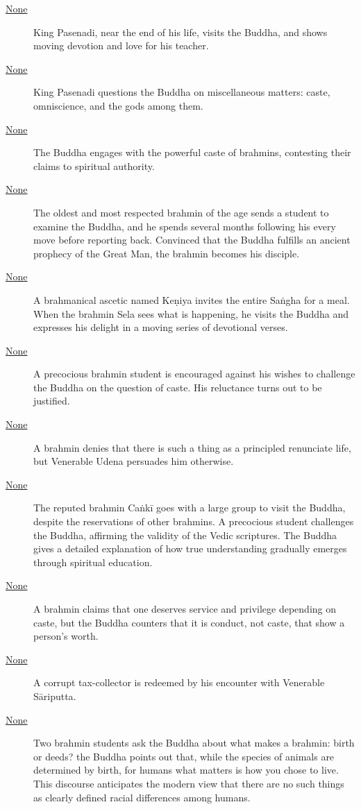 \documentclass[12pt,openany]{book}%
\begin{document}
\begin{description}
\item[\href{\#mn89}{None}] King Pasenadi, near the end of his life, visits the Buddha, and shows moving devotion and love for his teacher.%
\item[\href{\#mn90}{None}] King Pasenadi questions the Buddha on miscellaneous matters: caste, omniscience, and the gods among them.%
\item[\href{\#mn{-}brahmanavagga}{None}] The Buddha engages with the powerful caste of brahmins, contesting their claims to spiritual authority.%
\item[\href{\#mn91}{None}] The oldest and most respected brahmin of the age sends a student to examine the Buddha, and he spends several months following his every move before reporting back. Convinced that the Buddha fulfills an ancient prophecy of the Great Man, the brahmin becomes his disciple.%
\item[\href{\#mn92}{None}] A brahmanical ascetic named \textsanskrit{Keṇiya} invites the entire \textsanskrit{Saṅgha} for a meal. When the brahmin Sela sees what is happening, he visits the Buddha and expresses his delight in a moving series of devotional verses.%
\item[\href{\#mn93}{None}] A precocious brahmin student is encouraged against his wishes to challenge the Buddha on the question of caste. His reluctance turns out to be justified.%
\item[\href{\#mn94}{None}] A brahmin denies that there is such a thing as a principled renunciate life, but Venerable Udena persuades him otherwise.%
\item[\href{\#mn95}{None}] The reputed brahmin \textsanskrit{Caṅkī} goes with a large group to visit the Buddha, despite the reservations of other brahmins. A precocious student challenges the Buddha, affirming the validity of the Vedic scriptures. The Buddha gives a detailed explanation of how true understanding gradually emerges through spiritual education.%
\item[\href{\#mn96}{None}] A brahmin claims that one deserves service and privilege depending on caste, but the Buddha counters that it is conduct, not caste, that show a person’s worth.%
\item[\href{\#mn97}{None}] A corrupt tax-collector is redeemed by his encounter with Venerable \textsanskrit{Sāriputta}.%
\item[\href{\#mn98}{None}] Two brahmin students ask the Buddha about what makes a brahmin: birth or deeds? the Buddha points out that, while the species of animals are determined by birth, for humans what matters is how you chose to live. This discourse anticipates the modern view that there are no such things as clearly defined racial differences among humans.%

\end{description}
\end{document}
